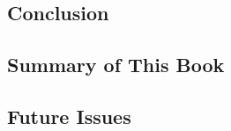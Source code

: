 \begin{bibunit}
\setcounter{chapter}{2}
\chapter{Conclusion}\label{chap:3}
\acresetall

\section{Summary of This Book}

\lipsum[60]


\section{Future Issues}

\lipsum[60]


\putbib
\end{bibunit}